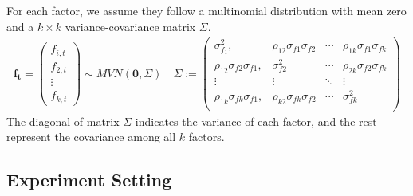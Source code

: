 \documentclass[12pt]{article}
\begin{document}
 For each factor, we assume they follow a multinomial distribution with mean zero and a $k\times k$ variance-covariance matrix $\Sigma$. 
\begin{align*}
\mathbf{f_t} = \begin{pmatrix}
f_{i,t}\\f_{2,t}\\\vdots\\f_{k,t}
\end{pmatrix} \sim MVN(\mathbf{0}, \Sigma) \quad
 \Sigma := 
\begin{pmatrix}
\sigma^2_{f_1}, & \rho_{12}\sigma_{f1}\sigma_{f2} &\cdots  & \rho_{1k}\sigma_{f1}\sigma_{fk}\\
\rho_{12}\sigma_{f2}\sigma_{f1}, & \sigma^2_{f2} &\cdots  & \rho_{2k}\sigma_{f2}\sigma_{fk}\\
\vdots & \vdots & \ddots & \vdots \\
\rho_{1k}\sigma_{fk}\sigma_{f1}, & \rho_{k2}\sigma_{fk}\sigma_{f2} &\cdots  & \sigma^2_{fk}\\
\end{pmatrix}
\end{align*}
The diagonal of matrix $\Sigma$ indicates the variance of each factor, and the rest represent the covariance among all $k$ factors.


	\subsection{Experiment Setting}\label{exp_set}
\end{document}
